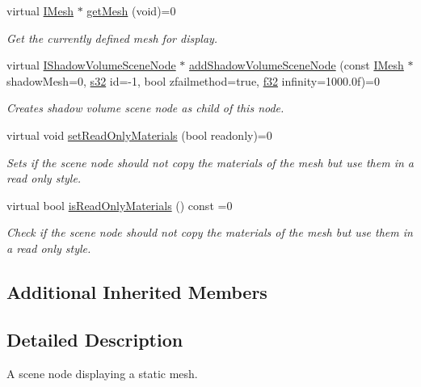 \begin{DoxyCompactItemize}
virtual \hyperlink{classirr_1_1scene_1_1IMesh}{I\+Mesh} $\ast$ \hyperlink{classirr_1_1scene_1_1IMeshSceneNode_afe540de69bc3a058919cd5ce465be634}{get\+Mesh} (void)=0
\begin{DoxyCompactList}\small\item\em Get the currently defined mesh for display. \end{DoxyCompactList}\item 
virtual \hyperlink{classirr_1_1scene_1_1IShadowVolumeSceneNode}{I\+Shadow\+Volume\+Scene\+Node} $\ast$ \hyperlink{classirr_1_1scene_1_1IMeshSceneNode_ad7cd00b302466dea891c7a0b6b28de19}{add\+Shadow\+Volume\+Scene\+Node} (const \hyperlink{classirr_1_1scene_1_1IMesh}{I\+Mesh} $\ast$shadow\+Mesh=0, \hyperlink{namespaceirr_ac66849b7a6ed16e30ebede579f9b47c6}{s32} id=-\/1, bool zfailmethod=true, \hyperlink{namespaceirr_a0277be98d67dc26ff93b1a6a1d086b07}{f32} infinity=1000.\+0f)=0
\begin{DoxyCompactList}\small\item\em Creates shadow volume scene node as child of this node. \end{DoxyCompactList}\item 
virtual void \hyperlink{classirr_1_1scene_1_1IMeshSceneNode_a3bae73b4f7b1a6b265a62ece964c008f}{set\+Read\+Only\+Materials} (bool readonly)=0
\begin{DoxyCompactList}\small\item\em Sets if the scene node should not copy the materials of the mesh but use them in a read only style. \end{DoxyCompactList}\item 
virtual bool \hyperlink{classirr_1_1scene_1_1IMeshSceneNode_a1d7de4331b84480598f636c929418e3d}{is\+Read\+Only\+Materials} () const =0
\begin{DoxyCompactList}\small\item\em Check if the scene node should not copy the materials of the mesh but use them in a read only style. \end{DoxyCompactList}\end{DoxyCompactItemize}
\subsection*{Additional Inherited Members}


\subsection{Detailed Description}
A scene node displaying a static mesh. 

